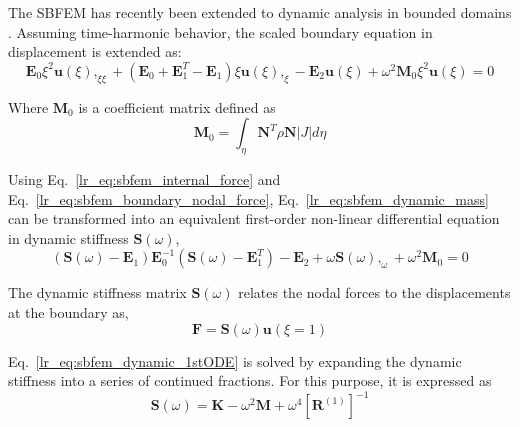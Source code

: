 The SBFEM has recently been extended to dynamic analysis in bounded domains \cite{Song2009}.
Assuming time-harmonic behavior, the scaled boundary equation in displacement is extended as:
\begin{equation}
    \mathbf{E}_0 \xi^2 \mathbf{u}(\xi),_{\xi\xi} +
    (\mathbf{E}_0 + \mathbf{E}_1^T - \mathbf{E}_1)\xi \mathbf{u}(\xi),_{\xi} -
    \mathbf{E}_2 \mathbf{u}(\xi) + \omega^2 \mathbf{M}_0 \xi^2 \mathbf{u}(\xi) = 0
    \label{lr_eq:sbfem_dynamic}
\end{equation}

Where $\mathbf{M}_0$ is a coefficient matrix defined as
\begin{equation}
    \mathbf{M}_0 = \int_\eta \mathbf{N}^T \rho \mathbf{N}|J| d\eta
    \label{lr_eq:sbfem_dynamic_mass}
\end{equation}

Using Eq.~\ref{lr_eq:sbfem_internal_force} and Eq.~\ref{lr_eq:sbfem_boundary_nodal_force}, Eq.~\ref{lr_eq:sbfem_dynamic_mass} can be transformed into an equivalent first-order non-linear differential equation in dynamic stiffness $\mathbf{S}(\omega)$,
\begin{equation}
    (\mathbf{S}(\omega)-\mathbf{E}_1)\mathbf{E}_0^{-1}
    (\mathbf{S}(\omega)-\mathbf{E}_1^T) - \mathbf{E}_2 +
    \omega \mathbf{S}(\omega),_\omega + \omega^2 \mathbf{M}_0 = 0
    \label{lr_eq:sbfem_dynamic_1stODE}
\end{equation}

The dynamic stiffness matrix $\mathbf{S}(\omega)$ relates the nodal forces to the displacements at the boundary as,
\begin{equation}
    \mathbf{F} = \mathbf{S}(\omega) \mathbf{u}(\xi=1)
    \label{lr_eq:sbfem_dynamic_nodal_force}
\end{equation}

Eq.~\ref{lr_eq:sbfem_dynamic_1stODE} is solved by expanding the dynamic stiffness into a series of continued fractions.
For this purpose, it is expressed as
\begin{equation}
    \mathbf{S}(\omega) = \mathbf{K} - \omega^2 \mathbf{M} + \omega^4 \left[
        \mathbf{R}^{(1)}    
    \right]^{-1}
    \label{lr_eq:sbfem_dynamic_stiffness}
\end{equation}

